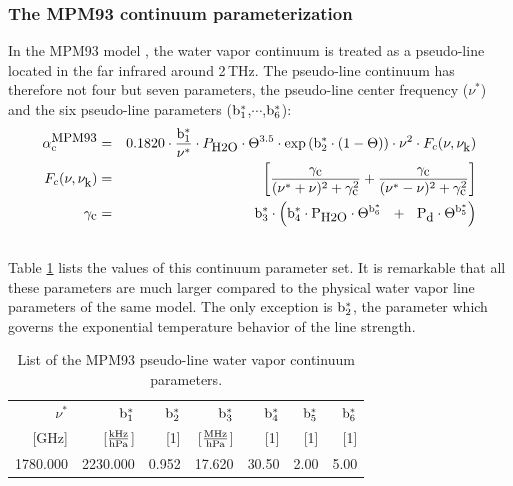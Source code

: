 \subsubsection{The MPM93 continuum parameterization}
\label{leveld:mpm93:contabs}
In the MPM93 model \citep{liebeetal:93}, the water 
vapor continuum is treated as a pseudo-line located in the far infrared 
around 2\,THz. The pseudo-line continuum has therefore not four but seven 
parameters, the pseudo-line center frequency ($\nu^*$) and the six 
pseudo-line parameters ($\rm b^*_{\rm 1}$,$\cdots$,$\rm b^*_{\rm 6}$):
%
\begin{eqnarray}
  \label{eq:abs_theory:mpm93:contabs}
  \alphampmnc & = & 0.1820 \cdot \frac{\beks}{\nu^*} \cdot \phzo \cdot 
                \Theta^{3.5} \cdot \exp{\left(\bzks\cdot(1-\Theta)\right)} \cdot 
                \nu^2 \cdot \shapec\\
%
  \label{eq:abs_theory:mpm93:contabs1}
   \shapec & = & \left[\frac{\gamc}{(\nu^*+\nu)^2+\gamc^2} + 
                       \frac{\gamc}{(\nu^*-\nu)^2+\gamc^2}\right]\\
%
  \label{eq:abs_theory:mpm93:contabs2}
  \gamc & = &  \bdks \cdot 
        \left(\bvks \cdot \phzo \cdot \Theta^{\bsks}~~+~~ 
                          \pda  \cdot \Theta^{\bfks}\right)\\
  \nonumber
\end{eqnarray}
%
Table \ref{tab:mpm93_cont_param} lists the values of this continuum 
parameter set. It is remarkable that all these parameters are much 
larger compared to the physical water vapor line parameters of the 
same model. The only exception is $\rm b^*_{\rm 2}$, the parameter 
which governs the exponential temperature behavior of the line strength. 
%
\begin{table}[!hbt]
  \begin{center}
  \begin{tabular}{rrrrrrr}
   \hline
   $\nu^*$ & $\rm b^*_{\rm 1}$ & $\rm b^*_{\rm 2}$ & $\rm b^*_{\rm 3}$ & $\rm b^*_{\rm 4}$ & $\rm b^*_{\rm 5}$ & $\rm b^*_{\rm 6}$\\
   {\rm [GHz]}  & {[$\frac{\rm kHz}{\rm hPa}$]} & {\rm [1]} & 
   {[$\frac{\rm MHz}{\rm hPa}$]} & {\rm [1]} & {\rm [1]} & {\rm [1]} \\
    \hline
   1780.000 & 2230.000 & 0.952 & 17.620 & 30.50 & 2.00 & 5.00 \\
   \hline
  \end{tabular}
  \end{center}
  \caption{List of the MPM93 pseudo-line water vapor continuum parameters.}
  \label{tab:mpm93_cont_param}
\end{table}
